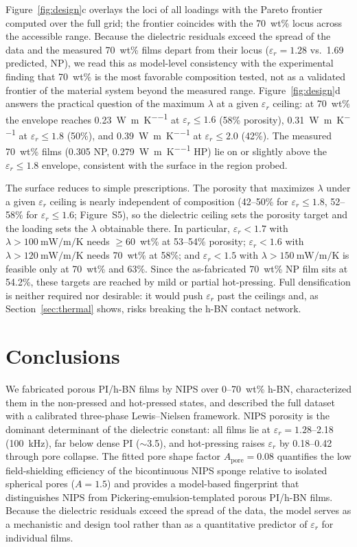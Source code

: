 \documentclass[preprint,a4paper]{elsarticle}
\newcommand{\eps}{\ensuremath{\varepsilon_r}}   %
\newcommand{\lam}{\ensuremath{\lambda}}
\newcommand{\Apore}{\ensuremath{A_{\mathrm{pore}}}}
\begin{document}
Figure~\ref{fig:design}c overlays the loci of all loadings with the Pareto frontier computed over the full grid; the frontier coincides with the 70~wt\% locus across the accessible range. Because the dielectric residuals exceed the spread of the data and the measured 70~wt\% films depart from their locus ($\eps = 1.28$ vs.\ 1.69 predicted, NP), we read this as model-level consistency with the experimental finding that 70~wt\% is the most favorable composition tested, not as a validated frontier of the material system beyond the measured range. Figure~\ref{fig:design}d answers the practical question of the maximum \lam{} at a given \eps{} ceiling: at 70~wt\% the envelope reaches \SI{0.23}{\watt\per\meter\per\kelvin} at $\eps \leq 1.6$ (58\% porosity), \SI{0.31}{\watt\per\meter\per\kelvin} at $\eps \leq 1.8$ (50\%), and \SI{0.39}{\watt\per\meter\per\kelvin} at $\eps \leq 2.0$ (42\%). The measured 70~wt\% films (0.305 NP, \SI{0.279}{\watt\per\meter\per\kelvin} HP) lie on or slightly above the $\eps \leq 1.8$ envelope, consistent with the surface in the region probed.

The surface reduces to simple prescriptions. The porosity that maximizes \lam{} under a given \eps{} ceiling is nearly independent of composition (42--50\% for $\eps \leq 1.8$, 52--58\% for $\eps \leq 1.6$; Figure~S5), so the dielectric ceiling sets the porosity target and the loading sets the \lam{} obtainable there. In particular, $\eps < 1.7$ with $\lam > \SI{100}{\milli\watt\per\meter\per\kelvin}$ needs $\geq$60~wt\% at 53--54\% porosity; $\eps < 1.6$ with $\lam > \SI{120}{\milli\watt\per\meter\per\kelvin}$ needs 70~wt\% at 58\%; and $\eps < 1.5$ with $\lam > \SI{150}{\milli\watt\per\meter\per\kelvin}$ is feasible only at 70~wt\% and 63\%. Since the as-fabricated 70~wt\% NP film sits at 54.2\%, these targets are reached by mild or partial hot-pressing. Full densification is neither required nor desirable: it would push \eps{} past the ceilings and, as Section~\ref{sec:thermal} shows, risks breaking the h-BN contact network.

\section{Conclusions}
\label{sec:conclusions}
We fabricated porous PI/h-BN films by NIPS over 0--70~wt\% h-BN, characterized them in the non-pressed and hot-pressed states, and described the full dataset with a calibrated three-phase Lewis--Nielsen framework. NIPS porosity is the dominant determinant of the dielectric constant: all films lie at $\eps = 1.28$--2.18 (\SI{100}{\kilo\hertz}), far below dense PI ($\sim$3.5), and hot-pressing raises \eps{} by 0.18--0.42 through pore collapse. The fitted pore shape factor $\Apore = 0.08$ quantifies the low field-shielding efficiency of the bicontinuous NIPS sponge relative to isolated spherical pores ($A = 1.5$) and provides a model-based fingerprint that distinguishes NIPS from Pickering-emulsion-templated porous PI/h-BN films. Because the dielectric residuals exceed the spread of the data, the model serves as a mechanistic and design tool rather than as a quantitative predictor of \eps{} for individual films.
\end{document}
